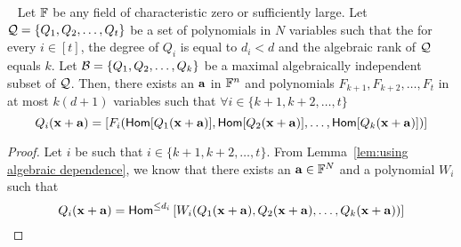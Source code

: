 \begin{corollary}~\label{cor:using algebraic independence new}
Let $\mathbb{F}$ be any  field of characteristic zero or sufficiently large. Let ${\cal Q} = \{Q_1, Q_2, \ldots, Q_t\}$ be a set of polynomials in $N$ variables such that the for every $i \in [t]$, the degree of  $Q_i$ is equal to $d_i < d$ and  the algebraic rank of ${\cal Q}$ equals $k$. Let  ${\cal B} = \{Q_1, Q_2, \ldots, Q_k\}$ be a maximal algebraically independent subset of ${\cal Q}$. Then, there exists an $\mathbf{a} $ in $\mathbb{F}^n$ and polynomials $F_{k+1}, F_{k+2}, \ldots, F_{t}$  in at most $k(d+1)$ variables such that $\forall i \in \{k+1, k+2, \ldots, t\}$
$$Q_i(\mathbf{x} + \mathbf{a}) = \left[F_i(\mathsf{Hom}[Q_1(\mathbf{x} + \mathbf{a})], \mathsf{Hom}[Q_2(\mathbf{x} + \mathbf{a})], \ldots, \mathsf{Hom}[Q_k(\mathbf{x} + \mathbf{a})]) \right] $$
\end{corollary}
\begin{proof}
Let $i$ be such that $ i \in \{k+1, k+2, \ldots, t\}$. From Lemma~\ref{lem:using algebraic dependence}, we know that there exists an $\mathbf{a} \in \mathbb{F}^N$ and a polynomial $W_{i}$ such that 
\[
Q_{i}(\mathbf{x} + \mathbf{a}) = \mathsf{Hom}^{\leq d_{i}}\left[W_{i}(Q_{1}(\mathbf{x} + \mathbf{a}), Q_{2}(\mathbf{x} + \mathbf{a}), \ldots, Q_{k}(\mathbf{x} + \mathbf{a})) \right] 
\]


\end{proof}
